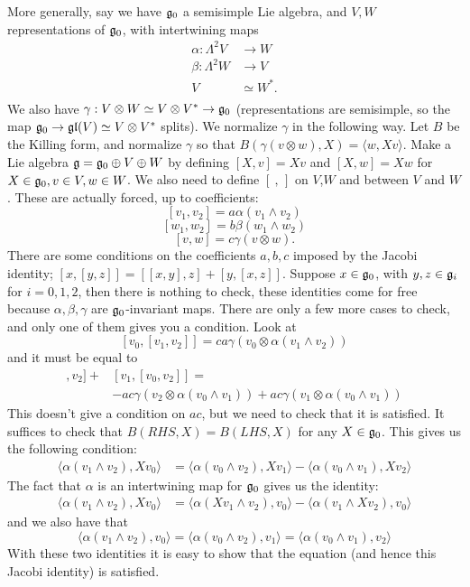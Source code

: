 More generally, say we have $\mathfrak{g}_0$ a semisimple Lie algebra, and $V,W$ representations of
 $\mathfrak{g}_0$, with intertwining maps
 \begin{align*}
   \alpha:\Lambda^2 V&\to W \\
   \beta: \Lambda^2 W&\to V \\
   V&\simeq W^* . \\
 \end{align*}
  We also have $\gamma: V\otimes W\simeq V\otimes V^*\to \mathfrak{g}_0$ (representations are semisimple,
  so the map $\mathfrak{g}_0\to \mathfrak{gl}(V)\simeq V\otimes V^*$ splits).
  We normalize $\gamma$ in the following way. Let $B$ be the Killing form, and normalize $\gamma$ so that
  $B(\gamma(v\otimes w),X) = \langle w,Xv\rangle$. Make a Lie algebra $\mathfrak{g} =
  \mathfrak{g}_0\oplus V\oplus W$ by defining $[X,v]=Xv$ and $[X,w]=Xw$ for $X\in \mathfrak{g}_0, v\in V,w\in
  W$. We also need to define  $[\ ,\,]$ on $V$,$W$ and between $V$ and $W$. These are actually
  forced, up to coefficients:
  \[ [v_1,v_2] = a\alpha(v_1\wedge v_2) \]
  \[ [w_1,w_2] = b\beta(w_1\wedge w_2) \]
  \[ [v,w] = c\gamma(v\otimes w). \]
 There are some conditions on the coefficients $a,b,c$
 imposed by the Jacobi identity;
 $[x,[y,z]] = [[x,y],z]+[y,[x,z]]$. Suppose $x\in \mathfrak{g}_0$, with $y,z\in \mathfrak{g}_i$ for
 $i=0,1,2$, then there is nothing to check, these identities come for free because
 $\alpha,\beta, \gamma$ are $\mathfrak{g}_0$-invariant maps. There are only a few more cases to
 check, and only one of them gives you a condition. Look at
 \[
    [v_0,[v_1,v_2]] = ca\gamma(v_0\otimes \alpha(v_1\wedge v_2)) \tag{RHS}
 \]
 and it must be equal to
 \begin{align*}
   [[v_0,v_1],v_2]+&[v_1,[v_0,v_2]] = \\ & -ac\gamma(v_2\otimes \alpha(v_0\wedge v_1)) +
   ac\gamma(v_1\otimes \alpha(v_0\wedge v_1)) \tag{LHS}
 \end{align*}
 This doesn't give a condition on $ac$, but we need to check that it is satisfied.
 It suffices to check that $B(RHS,X)=B(LHS,X)$ for any $X\in \mathfrak{g}_0$. This
 gives us the following condition:
 \begin{align*}
   \langle \alpha ( v_1\wedge v_2),Xv_0\rangle &= \langle \alpha(v_0\wedge
   v_2),Xv_1\rangle - \langle \alpha(v_0\wedge v_1),Xv_2\rangle
 \end{align*}
 The fact that $\alpha$ is an intertwining map for $\mathfrak{g}_0$ gives us the identity:
 \begin{align*}
   \langle \alpha ( v_1\wedge v_2),Xv_0\rangle &= \langle \alpha(Xv_1\wedge
   v_2),v_0\rangle - \langle \alpha(v_1\wedge Xv_2),v_0\rangle
 \end{align*}
 and we also have that
 \[
   \langle \alpha ( v_1\wedge v_2),v_0\rangle = \langle \alpha(v_0\wedge
   v_2),v_1\rangle = \langle \alpha(v_0\wedge v_1),v_2\rangle
 \]
 With these two identities it is easy to show that the equation
 (and hence this Jacobi identity) is satisfied.


